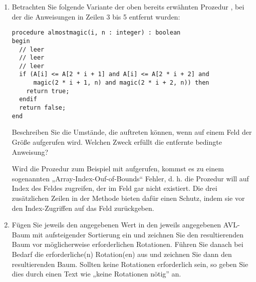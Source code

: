 \documentclass{bschlangaul-aufgabe}
\begin{document}
\begin{enumerate}
\begin{bAntwort}
\end{bAntwort}


\item Betrachten Sie folgende Variante  der oben bereits
erwähnten Prozedur , bei der die Anweisungen in Zeilen 3 bis 5
entfernt wurden:


\begin{verbatim}
procedure almostmagic(i, n : integer) : boolean
begin
  // leer
  // leer
  // leer
  if (A[i] <= A[2 * i + 1] and A[i] <= A[2 * i + 2] and
      magic(2 * i + 1, n) and magic(2 * i + 2, n)) then
    return true;
  endif
  return false;
end
\end{verbatim}



Beschreiben Sie die Umstände, die auftreten können, wenn 
auf einem Feld der Größe  aufgerufen wird. Welchen Zweck erfüllt
die entfernte bedingte Anweisung?

\begin{bAntwort}
Wird die Prozedur zum Beispiel mit  aufgerufen,
kommst es zu einem sogenannten „Array-Index-Ouf-of-Bounds“ Fehler, d. h.
die Prozedur will auf Index des Feldes zugreifen, der im Feld gar nicht
existiert. Die drei zusätzlichen Zeilen in der Methode  bieten
dafür einen Schutz, indem sie vor den Index-Zugriffen auf das Feld
 zurückgeben.

\end{bAntwort}


\item Fügen Sie jeweils den angegebenen Wert in den jeweils angegebenen
AVL-Baum mit aufsteigender Sortierung ein und zeichnen Sie den
resultierenden Baum vor möglicherweise erforderlichen Rotationen. Führen
Sie danach bei Bedarf die erforderliche(n) Rotation(en) aus und zeichnen
Sie dann den resultierenden Baum. Sollten keine Rotationen erforderlich
sein, so geben Sie dies durch einen Text wie „keine Rotationen nötig”
an.


\end{enumerate}
\end{document}
